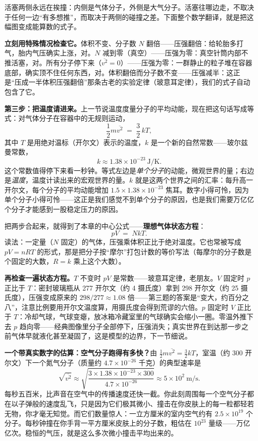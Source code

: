 活塞两侧永远在挨撞：内侧是气体分子，外侧是大气分子。活塞往哪边走，不取决于任何一边“有多想推”，而取决于两侧的碰撞之差。下面整个数学翻译，就是把这幅图变成能算数的式子。

\textbf{立刻用特殊情况检查它。}体积不变、分子数 \(N\) 翻倍——压强翻倍：给轮胎多打气，胎内气压确实上涨，对。\(N\) 减到零（真空）——压强为零：真空针筒内部不推活塞，对。所有分子停下来（\(\overline{v^2}=0\)）——压强为零：一群静止的粒子堆在容器底部，确实顶不住任何东西，对。体积翻倍而分子数不变——压强减半：这正是“压成一半体积压强翻倍”那条古老的实验定律（玻意耳定律），我们的式子自动包含了它。

\textbf{第三步：把温度请进来。}上一节说温度度量分子的平均动能，现在把这句话写成等式：对气体分子在容器中的无规则运动，
\[
\frac{1}{2} m \overline{v^{2}} \;=\; \frac{3}{2}\, k T,
\]
其中 \(T\) 是用绝对温标（开尔文）表示的温度，\(k\) 是一个新的自然常数——玻尔兹曼常数，
\[
k \approx 1.38\times 10^{-23}\ \text{J/K}.
\]
这个常数值得停下来看一秒钟。等式左边是\emph{单个分子}的动能，微观世界的量；右边是\emph{温度}，温度计读出来的宏观世界的量。\(k\) 就是这两个世界之间的汇率：每升高一开尔文，每个分子的平均动能增加 \(1.5\times 1.38\times 10^{-23}\) 焦耳。数字小得可怜，因为单个分子小得可怜——这正是我们感觉不到单个分子的原因，也是我们需要万亿亿个分子才能感到一股稳定压力的原因。

把两步合起来，就得到了本章的中心公式——\textbf{理想气体状态方程}：
\[
pV \;=\; NkT.
\]
读法：一定量（\(N\) 固定）的气体，压强乘体积正比于绝对温度。它也常被写成 \(pV = nRT\) 的形式，那是把分子按“摩尔”打包计数的等价写法（每摩尔的分子数是个固定的大数，\(R = k\) 乘上这个大数）。

\textbf{再检查一遍状态方程。}\(T\) 不变时 \(pV\) 是常数——玻意耳定律，老朋友。\(V\) 固定时 \(p\) 正比于 \(T\)：密封玻璃瓶从 277 开尔文（约 4 摄氏度）拿到 298 开尔文（约 25 摄氏度），压强变成原来的 \(298/277 \approx 1.08\) 倍——第三题的答案是“变大，约百分之八”，注意比例要用开尔文温度算，用摄氏度会得到荒谬的六倍。\(p\) 固定时 \(V\) 正比于 \(T\)：冷却气球，气球变瘪，放冰箱冷藏室里的气球确实会缩小一圈。零温外推下去 \(p\) 趋向零——经典图像里分子全部停下，压强消失；真实世界在到达那一步之前气体早就液化甚至凝固了，这是模型的边界，下一节细说。

\textbf{一个带真实数字的估算：空气分子跑得有多快？}由 \(\frac{1}{2}m\overline{v^2}=\frac{3}{2}kT\)，室温（约 300 开尔文）下一个氮气分子（质量约 \(4.7\times10^{-26}\) 千克）的典型速率是
\[
\sqrt{\overline{v^2}} \approx \sqrt{\frac{3\times 1.38\times 10^{-23}\times 300}{4.7\times 10^{-26}}} \approx 5\times 10^{2}\ \text{m/s}.
\]
每秒五百米，比声音在空气中的传播速度还快一截。你此刻周围每一个空气分子都在以子弹般的速度乱飞，只是因为它们极其微小、撞击在你皮肤上的每一粒都轻若无物，你才毫无知觉。而它们数量惊人：一立方厘米的室内空气约有 \(2.5\times10^{19}\) 个分子。每秒钟撞在你手背一平方厘米皮肤上的分子数，粗估在 \(10^{23}\) 量级——万亿亿次。稳恒的气压，就是这么多次微小撞击平均出来的。

